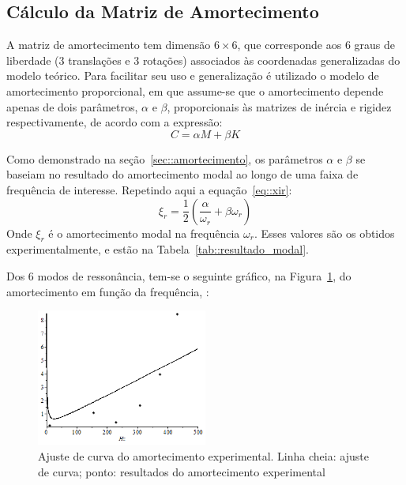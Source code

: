 \subsection{Cálculo da Matriz de Amortecimento}

A matriz de amortecimento tem dimensão $6 \times 6$, que corresponde aos 6 graus
de liberdade (3 translações e 3 rotações) associados às coordenadas
generalizadas do modelo teórico. Para facilitar seu uso e generalização é
utilizado o modelo de amortecimento proporcional, em que assume-se
que o amortecimento depende apenas de dois parâmetros, $\alpha$
e $\beta$, proporcionais às matrizes de inércia e rigidez respectivamente, de
acordo com a expressão:
%
\begin{equation*}
	C = \alpha  M + \beta  K
\end{equation*}
%

Como demonstrado na seção~\ref{sec::amortecimento}, os parâmetros $\alpha$
e $\beta$ se baseiam no resultado do amortecimento modal ao longo de uma
faixa de frequência de interesse. Repetindo aqui a equação~\ref{eq::xir}:
%
\begin{equation*}
	\xi_r = \frac{1}{2}\left(\frac{\alpha}{\omega_r} + \beta \omega_r\right )
\end{equation*}
%
Onde $\xi_r$ é o amortecimento modal na frequência $ \omega_r$. Esses valores
são os obtidos experimentalmente, e estão na
Tabela~\ref{tab::resultado_modal}.


Dos 6 modos de ressonância, tem-se o seguinte gráfico, na
Figura~\ref{fig::ajuste_rayleigh}, do amortecimento em função da frequência, :

\begin{figure}[h]
	\centering 
 	\includegraphics[width=0.50\textwidth]{figs/ajuste_rayleigh}
 	\caption[Ajuste de curva do amortecimento experimental]{Ajuste de curva do
 	amortecimento experimental. Linha cheia: ajuste de curva; ponto: resultados
 	do amortecimento experimental}
 	\label{fig::ajuste_rayleigh}
\end{figure}

